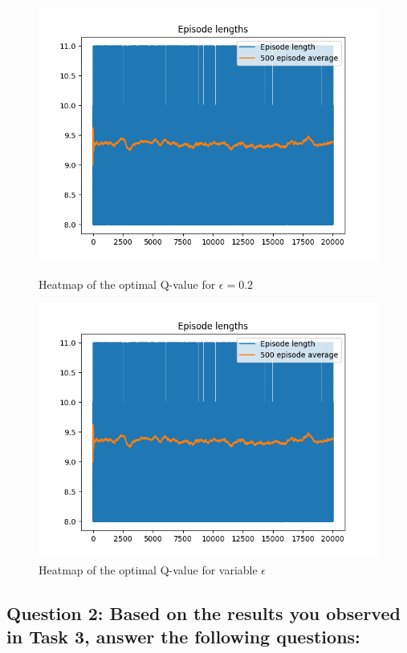 \documentclass[12pt]{article}
\begin{document}
\begin{figure}[ht]
    \centering
   \begin{minipage}{0.48\textwidth}
     \centering
     \includegraphics[width=0.9\linewidth]{exercise-3/plots/episodes-fixed-0.0.png}
     \caption{Heatmap of the optimal Q-value for $\epsilon=0.2$}
     \label{fig:task-2-1}
   \end{minipage}\hfill
   \begin{minipage}{0.48\textwidth}
     \centering
     \includegraphics[width=0.9\linewidth]{exercise-3/plots/episodes-fixed-0.0-q0-50.png}
     \caption{Heatmap of the optimal Q-value for variable $\epsilon$}
     \label{fig:task-2-2}
   \end{minipage}
\end{figure}

\subsection{Question 2: Based on the results you observed in Task 3, answer the following questions:}
\end{document}
